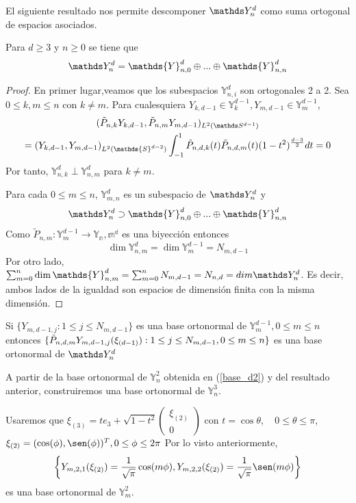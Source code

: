 El siguiente resultado nos permite descomponer $\spharm$ como suma ortogonal de espacios asociados.
\begin{thm}Para $d\ge 3$ y $n\ge 0$ se tiene que $$
	\spharm = \mathds{Y}^d_{n,0} \oplus ... \oplus \mathds{Y}^d_{n,n}
$$
\end{thm}
\begin{proof}
En primer lugar,veamos que los subespacios $\mathds{Y}^d_{n,i}$ son ortogonales 2 a 2. Sea $0\le k,m\le n$ con $k \neq m$. Para cualesquiera $Y_{k,d-1}\in\mathds{Y}_k^{d-1},Y_{m,d-1}\in\mathds{Y}_m^{d-1}$,
\begin{gather}
(\tilde{P}_{n,k}Y_{k,d-1},\tilde{P}_{n,m}Y_{m,d-1})_{L^2(\sphere)} \\= (Y_{k,d-1},Y_{m,d-1})_{L^2(\mathds{S}^{d-2})}\int_{-1}^{1} \tilde{P}_{n,d,k}(t)\tilde{P}_{n,d,m}(t)(1-t^2)^{\frac{d-3}{2}}dt = 0
\end{gather}
Por tanto, $\mathds{Y}^d_{n,k}\perp\mathds{Y}^d_{n,m}$ para $k\neq m$.

Para cada $0\le m\le n$, $\mathds{Y}^d_{m,n}$ es un subespacio de $\spharm$ y $$
\spharm \supset \mathds{Y}^d_{n,0} \oplus ... \oplus \mathds{Y}^d_{n,n}$$
Como $\tilde{P}_{n,m}:\mathds{Y}_{m}^{d-1} \to \mathds{Y_n,{m}^{d}}$ es una biyección entonces $$\dim \mathds{Y}_{n,m}^{d} = \dim \mathds{Y}_{m}^{d-1} = N_{m,d-1}$$
Por otro lado, $\sum_{m=0}^{n} \dim \mathds{Y}_{n,m}^{d} = \sum_{m=0}^{n} N_{m,d-1} =  N_{n,d} = dim \spharm$.
Es decir, ambos lados de la igualdad son espacios de dimensión finita con la misma dimensión.
\end{proof}
\begin{rem}Si $\{Y_{m,d-1,j}:1\le j \le N_{m,d-1}\}$ es una base ortonormal de $\mathds{Y}_m^{d-1}, 0\le m\le n$ entonces $\{\tilde{P}_{n,d,m}Y_{m,d-1,j}(\xi_{(d-1)}):1\le j \le N_{m,d-1}, \\ 0\le m \le n\}$ es una base ortonormal de $\spharm$
\end{rem}
A partir de la base ortonormal de $\mathds{Y}^2_n$ obtenida en (\ref{base_d2}) y del resultado anterior, construiremos una base ortonormal de $\mathds{Y}^3_n$.
\bigskip

Usaremos que
$ \xi_{(3)} = te_3 + \sqrt{1-t^2}\begin{pmatrix}
\xi_{(2)} \\
0
\end{pmatrix}$ con $t=\cos \theta, \quad 0\le\theta\le\pi$,\\ $\xi_{(2)}=(\cos(\phi),\sen(\phi))^T, 0\le\phi \le 2\pi$
Por lo visto anteriormente, 
$$
\left\{Y_{m,2,1}(\xi_{(2)})=\frac{1}{\sqrt{\pi}}\cos(m\phi),Y_{m,2,2}(\xi_{(2)})=\frac{1}{\sqrt{\pi}}\sen(m\phi)\right\}
$$
es una base ortonormal de $\mathds{Y}^2_m$.

